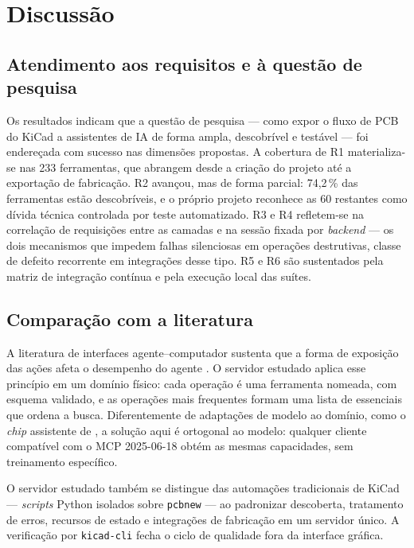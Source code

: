 \section{Discussão}\label{sec:discussao}

\subsection{Atendimento aos requisitos e à questão de pesquisa}

Os resultados indicam que a questão de pesquisa --- como expor o fluxo de PCB do
KiCad a assistentes de IA de forma ampla, descobrível e testável --- foi
endereçada com sucesso nas dimensões propostas. A cobertura de R1 materializa-se
nas 233 ferramentas, que abrangem desde a criação do projeto até a exportação
de fabricação. R2 avançou, mas de forma parcial: 74,2\,\% das ferramentas estão
descobríveis, e o próprio projeto reconhece as 60 restantes como dívida técnica
controlada por teste automatizado. R3 e R4 refletem-se na correlação de
requisições entre as camadas e na sessão fixada por \emph{backend} --- os dois
mecanismos que impedem falhas silenciosas em operações destrutivas, classe de
defeito recorrente em integrações desse tipo. R5 e R6 são sustentados pela
matriz de integração contínua e pela execução local das suítes.

\subsection{Comparação com a literatura}

A literatura de interfaces agente--computador sustenta que a forma de exposição
das ações afeta o desempenho do agente \citep{yang2024sweagent}. O servidor
estudado aplica esse princípio em um domínio físico: cada operação é uma
ferramenta nomeada, com esquema validado, e as operações mais frequentes formam
uma lista de essenciais que ordena a busca. Diferentemente de adaptações de
modelo ao domínio, como o \emph{chip} assistente de \citet{liu2023chipnemo}, a
solução aqui é ortogonal ao modelo: qualquer cliente compatível com o MCP
2025-06-18 obtém as mesmas capacidades, sem treinamento específico.

O servidor estudado também se distingue das automações tradicionais de KiCad
--- \emph{scripts} Python isolados sobre \texttt{pcbnew} \citep{swig} --- ao
padronizar descoberta, tratamento de erros, recursos de estado e integrações de
fabricação em um servidor único. A verificação por \texttt{kicad-cli}
\citep{kicadcli} fecha o ciclo de qualidade fora da interface gráfica.

